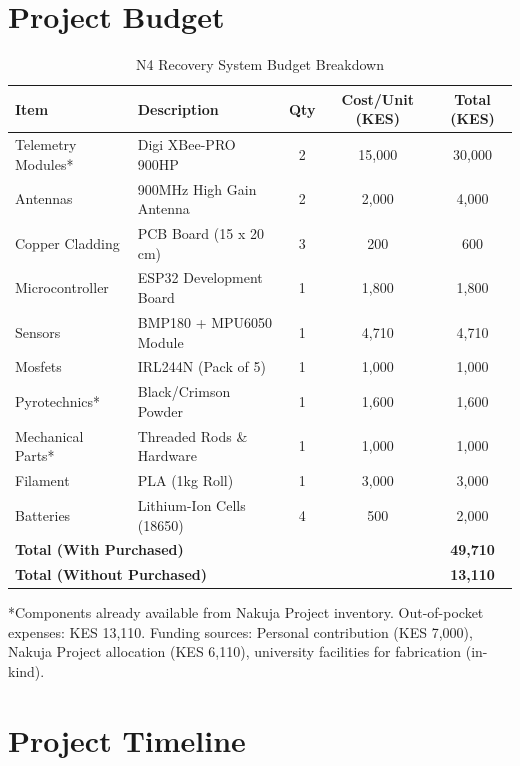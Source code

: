 \appendix

\section{Project Budget}
\label{appendix:budget}

\begin{table}[htbp]
\centering
\caption{N4 Recovery System Budget Breakdown}
\label{tab:budget}
\footnotesize
\begin{tabular}{@{}llccc@{}}
\toprule
\textbf{Item} & \textbf{Description} & \textbf{Qty} & \textbf{Cost/Unit (KES)} & \textbf{Total (KES)} \\
\midrule
Telemetry Modules* & Digi XBee-PRO 900HP & 2 & 15,000 & 30,000 \\
Antennas & 900MHz High Gain Antenna & 2 & 2,000 & 4,000 \\
Copper Cladding & PCB Board (15 x 20 cm) & 3 & 200 & 600 \\
Microcontroller & ESP32 Development Board & 1 & 1,800 & 1,800 \\
Sensors & BMP180 + MPU6050 Module & 1 & 4,710 & 4,710 \\
Mosfets & IRL244N (Pack of 5) & 1 & 1,000 & 1,000 \\
\midrule
Pyrotechnics* & Black/Crimson Powder & 1 & 1,600 & 1,600 \\
Mechanical Parts* & Threaded Rods \& Hardware & 1 & 1,000 & 1,000 \\
Filament & PLA (1kg Roll) & 1 & 3,000 & 3,000 \\
Batteries & Lithium-Ion Cells (18650) & 4 & 500 & 2,000 \\
\midrule
\multicolumn{4}{l}{\textbf{Total (With Purchased)}} & \textbf{49,710} \\
\multicolumn{4}{l}{\textbf{Total (Without Purchased)}} & \textbf{13,110} \\
\bottomrule
\end{tabular}
\end{table}

*Components already available from Nakuja Project inventory. Out-of-pocket expenses: KES 13,110. Funding sources: Personal contribution (KES 7,000), Nakuja Project allocation (KES 6,110), university facilities for fabrication (in-kind).

\section{Project Timeline}
\label{appendix:timeline}

